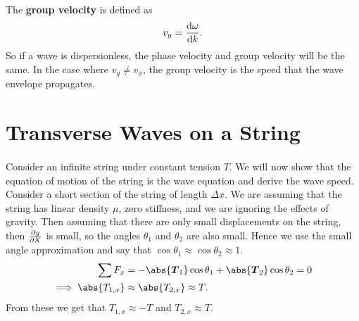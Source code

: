 \documentclass[../classical_mechanics.tex]{subfiles}
\begin{document}
        \paragraph{}
        The \textbf{group velocity} is defined as
        \begin{equation}
            v_g=\dv{\omega}{k}.
        \end{equation}
        So if a wave is dispersionless, the phase velocity and group velocity will be the same.
        In the case where $v_g\neq v_\phi$, the group velocity is the speed that the wave envelope propagates.

    \section{Transverse Waves on a String}
        \paragraph{}
        Consider an infinite string under constant tension $T$.
        We will now show that the equation of motion of the string is the wave equation and derive the wave speed.
        Consider a short section of the string of length $\Delta x$.
        We are assuming that the string has linear density $\mu$, zero stiffness, and we are ignoring the effects of gravity.
        Then assuming that there are only small displacements on the string, then $\pdv{y}{X}$ is small, so the angles $\theta_1$ and $\theta_2$ are also small.
        Hence we use the small angle approximation and say that $\cos\theta_1\approx\cos\theta_2\approx 1$.
        \begin{align}
            \sum F_x&=-\abs{\vec{T}_1}\cos\theta_1+\abs{\vec{T}_2}\cos\theta_2=0\\
            \implies\abs{T_{1,x}}&\approx\abs{T_{2,x}}\approx T.
        \end{align}
        From these we get that $T_{1,x}\approx -T$ and $T_{2,x}\approx T$.
        
\end{document}
